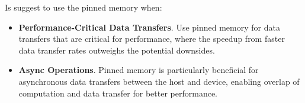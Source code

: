 Is suggest to use the pinned memory when:
\begin{itemize}
    \item[\textcolor{Green3}{\faIcon{check}}] \textcolor{Green3}{\textbf{Performance-Critical Data Transfers}}. Use pinned memory for data transfers that are critical for performance, where the speedup from faster data transfer rates outweighs the potential downsides.
    
    \item[\textcolor{Green3}{\faIcon{check}}] \textcolor{Green3}{\textbf{Async Operations}}. Pinned memory is particularly beneficial for asynchronous data transfers between the host and device, enabling overlap of computation and data transfer for better performance.
\end{itemize}
